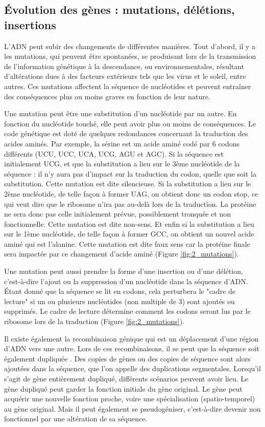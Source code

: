 \subsection{Évolution des gènes : mutations, délétions, insertions}\label{mutations}
\par L'ADN peut subir des changements de différentes manières. Tout d'abord, il y a les mutations, qui peuvent être spontanées, se produisant lors de la transmission de l'information génétique à la descendance, ou environnementales, résultant d'altérations dues à des facteurs extérieurs tels que les virus et le soleil, entre autres. Ces mutations affectent la séquence de nucléotides et peuvent entraîner des conséquences plus ou moins graves en fonction de leur nature.
\par Une mutation peut être une substitution d’un nucléotide par un autre. En fonction du nucléotide touché, elle peut avoir plus ou moins de conséquences. Le code génétique est doté de quelques redondances concernant la traduction des acides aminés. Par exemple, la sérine est un acide aminé codé par 6 codons différents (UCU, UCC, UCA, UCG, AGU et AGC). Si la séquence est initialement UCG, et que la substitution a lieu sur le 3ème nucléotide de la séquence : il n’y aura pas d’impact sur la traduction du codon, quelle que soit la substitution. Cette mutation est dite silencieuse. Si la substitution a lieu sur le 2ème nucléotide, de telle façon à former UAG, on obtient donc un codon stop, ce qui veut dire que le ribosome n'ira pas au-delà lors de la traduction. La protéine ne sera donc pas celle initialement prévue, possiblement tronquée et non fonctionnelle. Cette mutation est dite non-sens. Et enfin si la substitution a lieu sur le 1ème nucléotide, de telle façon à former GCC, on obtient un nouvel acide aminé qui est l'alanine. Cette mutation est dite faux sens car la protéine finale sera impactée par ce changement d'acide aminé (Figure \ref{fig:2_mutations}).
\par Une mutation peut aussi prendre la forme d'une insertion ou d'une délétion, c'est-à-dire l'ajout ou la suppression d'un nucléotide dans la séquence d'ADN. Étant donné que la séquence se lit en codons, cela perturbera le "cadre de lecture" si un ou plusieurs nucléotides (non multiple de 3) sont ajoutés ou supprimés. Le cadre de lecture détermine comment les codons seront lus par le ribosome lors de la traduction (Figure \ref{fig:2_mutations}). 
\par Il existe également la recombinaison génique qui est un déplacement d’une région d’ADN vers une autre. Lors de ces recombinaisons, il se peut que la séquence soit également dupliquée \parencite{sasaki_genome_2010, stewart_homologous_2022, syeda_recombination_2014}. Des copies de gènes ou des copies de séquence sont alors ajoutées dans la séquence, que l’on appelle des duplications segmentales. Lorsqu’il s’agit de gène entièrement dupliqué, différents scénarios peuvent avoir lieu. Le gène dupliqué peut garder la fonction initiale du gène original. Le gène peut acquérir une nouvelle fonction proche, voire une spécialisation (spatio-temporel) au gène original. Mais il peut également se pseudogéniser, c’est-à-dire devenir non fonctionnel par une altération de sa séquence. 
